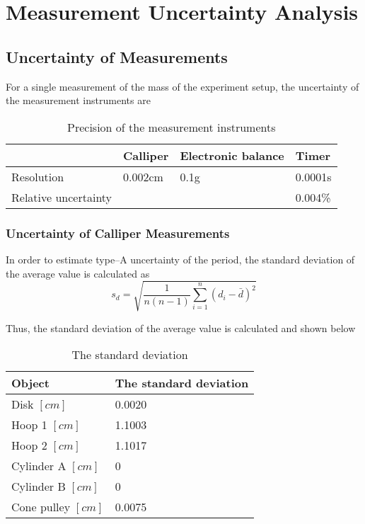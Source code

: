 \section{Measurement Uncertainty Analysis}


\subsection{Uncertainty of Measurements}
For a single measurement of the mass of the experiment setup, the uncertainty of the measurement instruments are

\begin{table}[H]
  \centering
  \begin{tabularx}{\textwidth}{|X|X|X|X|}
    \hline
     & Calliper & Electronic balance & Timer\\
	 \hline
	 Resolution & 0.002cm & 0.1g & 0.0001s \\
	 \hline
	 Relative uncertainty & & & 0.004\% \\
	\hline
  \end{tabularx}
  \caption{Precision of the measurement instruments}
  \end{table}

\subsubsection{Uncertainty of Calliper Measurements}

In order to estimate type–A uncertainty of the period, the standard deviation of the average value is calculated as
$$  s_d = \sqrt{\frac{1}{n(n-1)}\sum_{i=1}^{n}(d_i - \bar{d})^2 }  $$

Thus, the standard deviation of the average value is calculated and shown below

\begin{table}[H]
  \centering
  \begin{tabularx}{\textwidth}{|p{6cm}|X|}
    \hline
    Object & The standard deviation\\
    \hline
    Disk $[cm]$& 0.0020 \\
    Hoop 1 $[cm]$& 1.1003 \\
    Hoop 2 $[cm]$& 1.1017 \\
    Cylinder A $[cm]$& 0 \\
    Cylinder B $[cm]$& 0 \\
    Cone pulley $[cm]$& 0.0075 \\
    \hline
  \end{tabularx}
  \caption{The standard deviation}
  \end{table}
